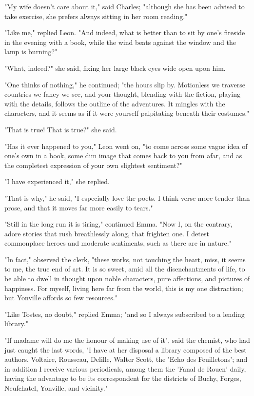 \documentclass{tufte-book}
\begin{document}
"My wife doesn't care about it," said Charles; "although she has
been advised to take exercise, she prefers always sitting in her room
reading."

"Like me," replied Leon. "And indeed, what is better than to sit by
one's fireside in the evening with a book, while the wind beats against
the window and the lamp is burning?"

"What, indeed?" she said, fixing her large black eyes wide open upon
him.

"One thinks of nothing," he continued; "the hours slip by. Motionless we
traverse countries we fancy we see, and your thought, blending with
the fiction, playing with the details, follows the outline of the
adventures. It mingles with the characters, and it seems as if it were
yourself palpitating beneath their costumes."

"That is true! That is true?" she said.

"Has it ever happened to you," Leon went on, "to come across some vague
idea of one's own in a book, some dim image that comes back to you from
afar, and as the completest expression of your own slightest sentiment?"

"I have experienced it," she replied.

"That is why," he said, "I especially love the poets. I think verse more
tender than prose, and that it moves far more easily to tears."

"Still in the long run it is tiring," continued Emma. "Now I, on the
contrary, adore stories that rush breathlessly along, that frighten one.
I detest commonplace heroes and moderate sentiments, such as there are
in nature."

"In fact," observed the clerk, "these works, not touching the heart,
miss, it seems to me, the true end of art. It is so sweet, amid all
the disenchantments of life, to be able to dwell in thought upon noble
characters, pure affections, and pictures of happiness. For myself,
living here far from the world, this is my one distraction; but Yonville
affords so few resources."

"Like Tostes, no doubt," replied Emma; "and so I always subscribed to a
lending library."

"If madame will do me the honour of making use of it", said the chemist,
who had just caught the last words, "I have at her disposal a library
composed of the best authors, Voltaire, Rousseau, Delille, Walter
Scott, the 'Echo des Feuilletons'; and in addition I receive various
periodicals, among them the 'Fanal de Rouen' daily, having the advantage
to be its correspondent for the districts of Buchy, Forges, Neufchatel,
Yonville, and vicinity."
\end{document}
